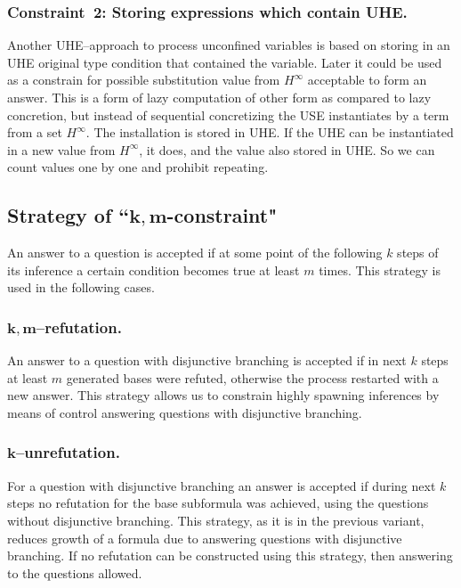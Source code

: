 \documentclass[runningheads,a4paper]{llncs}
\begin{document}
\subsubsection{Constraint~2: Storing expressions which contain UHE.}

Another UHE--approach to process unconfined variables is based on storing in an UHE original type condition that contained the variable.  Later it could be used as a constrain for possible substitution value from $H^{\infty}$ acceptable to form an answer. This is a form of lazy computation of other form as compared to lazy concretion, but instead of sequential concretizing the USE instantiates by a term from a set $H^{\infty}$. The installation is stored in UHE. If the UHE can be instantiated in a new value from $H^{\infty}$, it does, and the value also stored in UHE. So we can count values one by one and prohibit repeating.


\subsection{Strategy of ``$\boldsymbol{k,m}$-constraint"}
An answer to a question is accepted if at some point of the following $k$ steps of its inference a certain condition becomes true at least $m$ times. This strategy is used in the following cases.

\subsubsection{$\boldsymbol{k,m}$--refutation.} An answer to a question with disjunctive branching is accepted if in next $k$ steps at least $m$ generated bases were refuted, otherwise the process restarted with a new answer. This strategy allows us to constrain highly spawning inferences by means of control answering questions with disjunctive branching.

\subsubsection{$\boldsymbol{k}$--unrefutation.}
For a question with disjunctive branching an answer is accepted if during next $k$ steps no refutation for the base subformula was achieved, using the questions without disjunctive branching. This strategy, as it is in the previous variant, reduces growth of a formula due to answering questions with disjunctive branching. If no refutation can be constructed using this strategy, then answering to the questions allowed.
\end{document}

